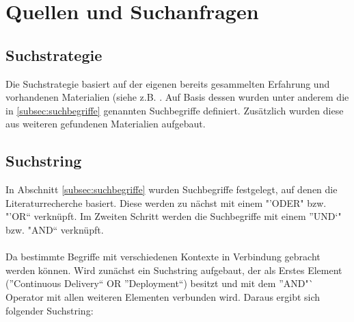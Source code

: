 \section{Quellen und Suchanfragen}
\label{sec:QuellenUndSuchanfragen}

\subsection{Suchstrategie}
\label{subsec:suchstrategie}
Die Suchstrategie basiert auf der eigenen bereits gesammelten Erfahrung und vorhandenen Materialien (siehe z.B. \cite{EWolff:CD}. Auf Basis dessen wurden unter anderem die in \ref{subsec:suchbegriffe}  genannten Suchbegriffe definiert. Zusätzlich wurden diese aus weiteren gefundenen Materialien aufgebaut.

\subsection{Suchstring}
\label{subsec:suchstring}
In Abschnitt \ref{subsec:suchbegriffe}  wurden Suchbegriffe festgelegt, auf denen die Literaturrecherche basiert. Diese werden zu nächst mit einem "'ODER" bzw. "'OR"` verknüpft. Im Zweiten Schritt werden die Suchbegriffe mit einem "'UND`" bzw. "AND"` verknüpft.
\\\\
Da bestimmte Begriffe mit verschiedenen Kontexte in Verbindung gebracht werden können. Wird zunächst ein Suchstring aufgebaut, der als Erstes Element ("'Continuous Delivery"` OR "'Deployment"`) besitzt und mit dem "'AND"` Operator mit allen weiteren Elementen verbunden wird. Daraus ergibt sich folgender Suchstring:

